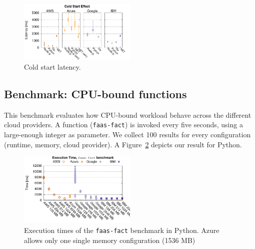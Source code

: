 \begin{figure}[!t]
\centering
\includegraphics[width=0.5\textwidth]{bilder/cold_start/coldstart_whisker.pdf}
\caption{Cold start latency.}
\label{fig:coldstart_plot}
\end{figure}



\subsection{Benchmark: CPU-bound functions}
\label{sec:general_test}
This benchmark evaluates how CPU-bound workload behave across the different cloud providers.
A function (\texttt{faas-fact}) is invoked every five seconds, using a large-enough integer as parameter. 
We collect 100 results for every configuration (runtime, memory, cloud provider).
A%
Figure~\ref{fig:general_python_plot} depicts our result for Python.

\begin{figure}[!t]
\centering
\includegraphics[width=0.5\textwidth]{bilder/general_python/cpufact.pdf}
\caption{Execution times of the \texttt{faas-fact} benchmark in Python. Azure allows only one single memory configuration (1536 MB)}
\label{fig:general_python_plot}

\end{figure}

